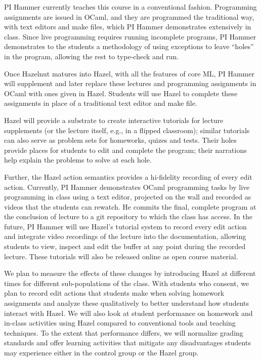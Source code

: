 \documentclass{purple}
\newcommand{\Hazel}[0]{\textsf{Hazel}\xspace}
\begin{document}
PI Hammer currently teaches this course in a conventional fashion.
%
Programming assignments are issued in OCaml, and they are programmed
the traditional way, with text editors and make files, which PI Hammer
demonstrates extensively in class.
%
Since live programming requires running incomplete programs, PI Hammer
demonstrates to the students a methodology of using exceptions to
leave ``holes'' in the program, allowing the rest to type-check and
run.

Once Hazelnut matures into \Hazel, with all the features of core ML,
PI Hammer will supplement and later replace these lectures and
programming assignments in OCaml with ones given in \Hazel.
%
Students will use \Hazel to complete these assignments in place of a
traditional text editor and make file.

\Hazel will provide a
substrate to create interactive tutorials for lecture supplements (or
the lecture itself, e.g., in a flipped classroom); similar tutorials
can also serve as problem sets for homeworks, quizes and tests.
%
Their holes provide places for students to edit and complete the
program; their narrations help explain the problems to solve at each
hole.

Further, the \Hazel action semantics provides a hi-fidelity recording
of every edit action. Currently, PI Hammer demonstrates OCaml
programming tasks by live programming in class using a text editor,
projected on the wall and recorded as videos that the students can
rewatch.  He commits the final, complete program at the conclusion of
lecture to a git repository to which the class has access.
%
In the future, PI Hammer will use \Hazel's tutorial system to record every edit action
and integrate video recordings of the lecture into the documentation,
allowing students to view, inspect and edit the buffer at any point
during the recorded lecture. These tutorials will also be released online as 
open course material. 

We plan to measure the effects of these changes by introducing \Hazel at
different times for different sub-populations of the class.  With
students who consent, we plan to record edit actions that students
make when solving homework assignments and analyze these qualitatively
to better understand how students interact with \Hazel.  We will also
look at student performance on homework and in-class activities using
\Hazel compared to conventional tools and teaching techniques.  To the
extent that performance differs, we will normalize grading standards and
offer learning activities that mitigate any disadvantages students may
experience either in the control group or the \Hazel group.
%
\end{document}
